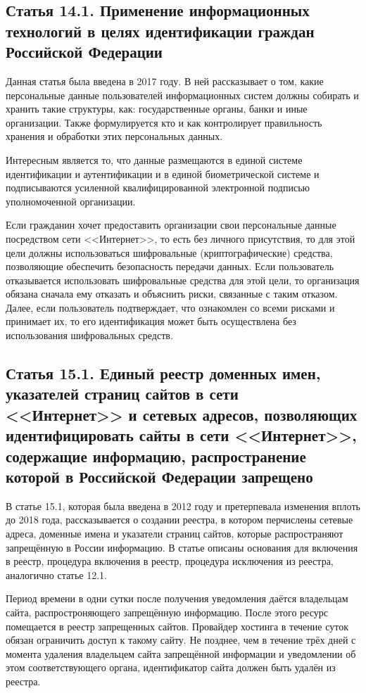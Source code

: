\subsection{Статья 14.1. Применение информационных технологий в целях идентификации граждан Российской Федерации}

Данная статья была введена в 2017 году. В ней рассказывает о том, какие персональные данные пользователей информационных систем должны собирать и хранить такие структуры, как: государственные органы, банки и иные организации. Также формулируется кто и как контролирует правильность хранения и обработки этих персональных данных.

Интересным является то, что данные размещаются в единой системе идентификации и аутентификации и в единой биометрической системе  и подписываются усиленной квалифицированной электронной подписью уполномоченной организации. 


Если гражданин хочет предоставить организации свои персональные данные посредством сети <<Интернет>>, то есть без личного присутствия, то для этой цели должны использоваться шифровальные (криптографические) средства, позволяющие обеспечить безопасность передачи данных. Если пользователь отказывается использовать шифровальные средства для этой цели, то организация обязана сначала ему отказать и объяснить риски, связанные с таким отказом. Далее, если пользователь подтверждает, что ознакомлен со всеми рисками и принимает их, то его идентификация может быть осуществлена без использования шифровальных средств.

\subsection{Статья 15.1. Единый реестр доменных имен, указателей страниц сайтов в сети <<Интернет>> и сетевых адресов, позволяющих идентифицировать сайты в сети <<Интернет>>, содержащие информацию, распространение которой в Российской Федерации запрещено}

В статье 15.1, которая была введена в 2012 году и претерпевала изменения вплоть до 2018 года, рассказывается о создании реестра, в котором перчислены сетевые адреса, доменные имена и указатели страниц сайтов, которые распространяют запрещённую в России информацию. В статье описаны основания для включения в реестр, процедура включения в реестр, процедура исключения из реестра, аналогично статье 12.1. 

Период времени в одни сутки после получения уведомления даётся владельцам сайта, распростроняющего запрещённую информацию. После этого ресурс помещается в реестр запрещенных сайтов. Провайдер хостинга в течение суток обязан ограничить доступ к такому сайту. Не позднее, чем в течение трёх дней с момента удаления владельцем сайта запрещённой информации и уведомлении об этом соответствующего органа, идентификатор сайта должен быть удалён из реестра.

